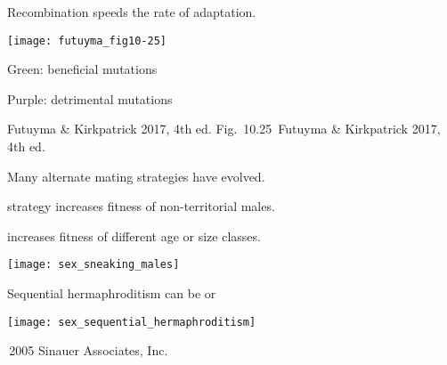 \documentclass[t]{beamer}
\newcommand{\futuyma}[1]{%
	\ifthenelse{\isempty{#1}}%
	{Futuyma \& Kirkpatrick 2017, 4th ed.}%
	{Fig.~#1~Futuyma \& Kirkpatrick 2017, 4th ed.}%
}
\newcommand{\backskip}{\vspace{-0.5\baselineskip}}
\begin{document}
\begin{frame}{Recombination speeds the rate of adaptation.}

\backskip

{\centering

\texttt{[image: futuyma\_fig10-25]}\par}

\vspace{-\baselineskip}

{\small Green: beneficial mutations

Purple: detrimental mutations}

\tinyfill \futuyma{10.25}

\end{frame}



\begin{frame}{Many alternate mating strategies have evolved.}

\vspace{-\baselineskip}

\begin{multicols}{2}

\hangpara {} strategy increases fitness of non-territorial males.

\vspace{6\baselineskip}

\hangpara {} increases fitness of different age or size classes.

\columnbreak

\centering

\noindent\texttt{[image: sex\_sneaking\_males]}

\smallskip

\end{multicols}

\end{frame}


\begin{frame}{Sequential hermaphroditism can be  or }


\texttt{[image: sex\_sequential\_hermaphroditism]}

\vfilll

\tinyfill \textcopyright\,2005 Sinauer Associates, Inc.

\end{frame}

\end{document}
